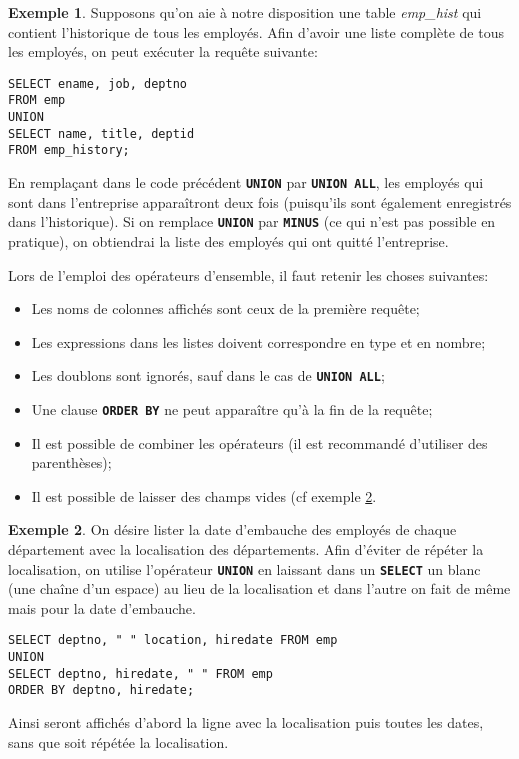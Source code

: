 \documentclass[a4paper, 12pt]{report}
\newcommand{\textSQL}[1]{\texttt{\textbf{#1}}}
\theoremstyle{definition} \newtheorem{ex}{Exemple}
\begin{document}
\begin{ex}
Supposons qu'on aie à notre disposition une table \emph{emp\_hist} qui contient l'historique de tous les employés. Afin d'avoir une liste complète de tous les employés, on peut exécuter la requête suivante: 
\begin{lstlisting}[frame=single]
SELECT ename, job, deptno
FROM emp
UNION
SELECT name, title, deptid
FROM emp_history;
\end{lstlisting}
En remplaçant dans le code précédent \textSQL{UNION} par \textSQL{UNION ALL}, les employés qui sont dans l'entreprise apparaîtront deux fois (puisqu'ils sont également enregistrés dans l'historique). Si on remplace \textSQL{UNION} par \textSQL{MINUS} (ce qui n'est pas possible en pratique), on obtiendrai la liste des employés qui ont quitté l'entreprise.
\end{ex}

Lors de l'emploi des opérateurs d'ensemble, il faut retenir les choses suivantes:
\begin{itemize}
\item Les noms de colonnes affichés sont ceux de la première requête;
\item Les expressions dans les listes doivent correspondre en type et en nombre;
\item Les doublons sont ignorés, sauf dans le cas de \textSQL{UNION ALL};
\item Une clause \textSQL{ORDER BY} ne peut apparaître qu'à la fin de la requête;
\item Il est possible de combiner les opérateurs (il est recommandé d'utiliser des parenthèses);
\item Il est possible de laisser des champs vides (cf exemple \ref{ex:blancs}.
\end{itemize}

\begin{ex} \label{ex:blancs}
On désire lister la date d'embauche des employés de chaque département avec la localisation des départements. Afin d'éviter de répéter la localisation, on utilise l'opérateur \textSQL{UNION} en laissant dans un \textSQL{SELECT} un blanc (une chaîne d'un espace) au lieu de la localisation et dans l'autre on fait de même mais pour la date d'embauche. 
\begin{lstlisting}[frame=single]
SELECT deptno, " " location, hiredate FROM emp
UNION
SELECT deptno, hiredate, " " FROM emp
ORDER BY deptno, hiredate;
\end{lstlisting} 
Ainsi seront affichés d'abord la ligne avec la localisation puis toutes les dates, sans que soit répétée la localisation.
\end{ex}
\end{document}
